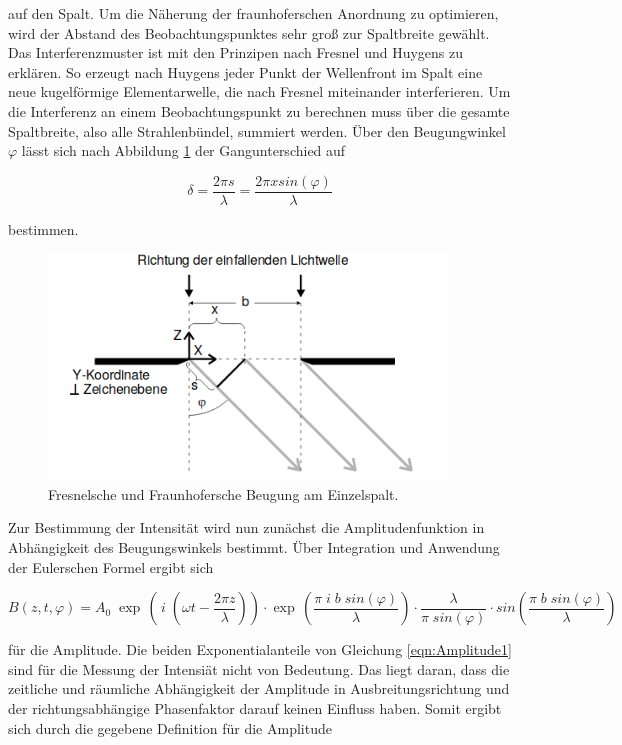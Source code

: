 auf den Spalt.
Um die Näherung der fraunhoferschen Anordnung zu optimieren, wird der Abstand des Beobachtungspunktes sehr groß zur Spaltbreite gewählt.
Das Interferenzmuster ist mit den Prinzipen nach Fresnel und Huygens zu erklären.
So erzeugt nach Huygens jeder Punkt der Wellenfront im Spalt eine neue kugelförmige Elementarwelle, die nach Fresnel miteinander interferieren.
Um die Interferenz an einem Beobachtungspunkt zu berechnen muss über die gesamte Spaltbreite, also alle Strahlenbündel, summiert werden.
Über den Beugungwinkel $\varphi$ lässt sich nach Abbildung \ref{fig:Einzel} der Gangunterschied auf

\begin{equation}
    \delta = \frac{2 \pi s}{\lambda} = \frac{2 \pi x sin(\varphi)}{\lambda}
    \label{eqn:Gang}
\end{equation}

bestimmen.

\begin{figure}[H]
    \centering
    \includegraphics[height=6cm]{Theorie/Einzel.png}
    \caption{Fresnelsche und Fraunhofersche Beugung am Einzelspalt. \cite{1}}
    \label{fig:Einzel}
\end{figure}

Zur Bestimmung der Intensität wird nun zunächst die Amplitudenfunktion in Abhängigkeit des Beugungswinkels bestimmt.
Über Integration und Anwendung der Eulerschen Formel ergibt sich

\begin{equation}
    B(z,t,\varphi) = A_0 \; \exp \, \left (\,i \;\left (\omega t - \frac{2 \pi z}{\lambda}\right)\right) \cdot \exp \, \left (\frac{\pi \; i \; b \; sin(\varphi)}{\lambda} \right) \cdot \frac{\lambda}{\pi \; sin(\varphi)} \cdot sin \left (\frac{\pi \; b\; sin(\varphi)}{\lambda}\right)
    \label{eqn:Amplitude1}
\end{equation}

für die Amplitude.
Die beiden Exponentialanteile von Gleichung \eqref{eqn:Amplitude1} sind für die Messung der Intensiät nicht von Bedeutung.
Das liegt daran, dass die zeitliche und räumliche Abhängigkeit der Amplitude in Ausbreitungsrichtung und der richtungsabhängige Phasenfaktor darauf keinen Einfluss haben.
Somit ergibt sich durch die gegebene Definition für die Amplitude

